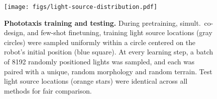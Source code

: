 \begin{figure}[b]
    \centering
    \texttt{[image: figs/light-source-distribution.pdf]}
    \vspace{-8pt}
    \caption{\textbf{Phototaxis training and testing.}
    During pretraining, simult.~co-design, and few-shot finetuning,
    training light source locations (gray circles) were sampled uniformly within 
    a circle centered on the robot's initial position (blue square).
    At every learning step,
    a batch of 8192 randomly positioned lights was sampled,
    and each was paired with a unique, random morphology and random terrain.
    Test light source locations (orange stars) 
    were identical across all methods for fair comparison.
    }
    \vspace{-8pt}
    \label{fig:methods-lightsource-dist}
\end{figure}